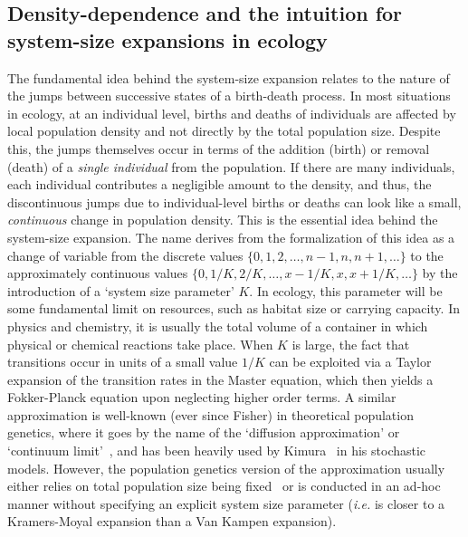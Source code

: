 \subsection{Density-dependence and the intuition for system-size expansions in ecology}
The fundamental idea behind the system-size expansion relates to the nature of the jumps between successive states of a birth-death process. In most situations in ecology, at an individual level, births and deaths of individuals are affected by local population density and not directly by the total population size. Despite this, the jumps themselves occur in terms of the addition (birth) or removal (death) of a \emph{single individual} from the population. If there are many individuals, each individual contributes a negligible amount to the density, and thus, the discontinuous jumps due to individual-level births or deaths can look like a small, \emph{continuous} change in population density. This is the essential idea behind the system-size expansion. The name derives from the formalization of this idea as a change of variable from the discrete values $\{0,1,2,\ldots,n-1,n,n+1,\ldots\}$ to the approximately continuous values $\{0,1/K,2/K,\dots,x-1/K,x,x+1/K,\ldots\}$ by the introduction of a `system size parameter' $K$. In ecology, this parameter will be some fundamental limit on resources, such as habitat size or carrying capacity. In physics and chemistry, it is usually the total volume of a container in which physical or chemical reactions take place. When $K$ is large, the fact that transitions occur in units of a small value $1/K$ can be exploited via a Taylor expansion of the transition rates in the Master equation, which then yields a Fokker-Planck equation upon neglecting higher order terms. A similar approximation is well-known (ever since Fisher) in theoretical population genetics, where it goes by the name of the `diffusion approximation'\citep{ewens_mathematical_2004} or `continuum limit'~\citep{czuppon_understanding_2021}, and has been heavily used by Kimura~\citep{crow_introduction_1970} in his stochastic models. However, the population genetics version of the approximation usually either relies on total population size being fixed~\citep{crow_introduction_1970, lande_natural_1976,ewens_mathematical_2004} or is conducted in an ad-hoc manner without specifying an explicit system size parameter (\emph{i.e.} is closer to a Kramers-Moyal expansion than a Van Kampen expansion).


